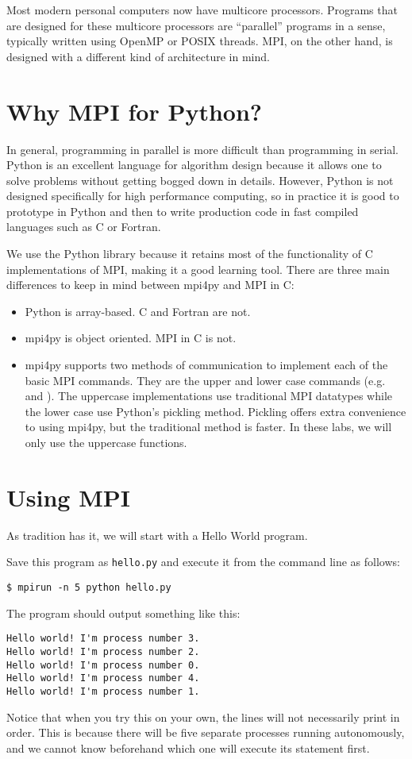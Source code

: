 \begin{info}
Most modern personal computers now have multicore processors. 
Programs that are designed for these multicore processors are ``parallel'' programs in a sense, typically written using OpenMP or POSIX threads.
MPI, on the other hand, is designed with a different kind of architecture in mind. 
\end{info}

\section*{Why MPI for Python?}
In general, programming in parallel is more difficult than programming in serial. 
Python is an excellent language for algorithm design because it allows one to solve problems without getting bogged down in details. 
However, Python is not designed specifically for high performance computing, so in practice it is good to prototype in Python and then to write production code in fast compiled languages such as C or Fortran.

We use the Python library  because it retains most of the functionality of 
C implementations of MPI, making it a good learning tool. 
There are three main differences to keep in mind between mpi4py and MPI in C:
\begin{itemize}
    \item Python is array-based. C and Fortran are not.
    \item mpi4py is object oriented. MPI in C is not.
    \item mpi4py supports two methods of communication to implement each of the basic MPI commands. 
    They are the upper and lower case commands (e.g.  and ). 
    The uppercase implementations use traditional MPI datatypes while the lower case use 
    Python's pickling method. Pickling offers extra convenience to using mpi4py, 
    but the traditional method is faster. In these labs, we will only use the uppercase functions.
\end{itemize}


\section*{Using MPI}
As tradition has it, we will start with a Hello World program.

Save this program as \texttt{hello.py} and execute it from the command line as follows:
\begin{lstlisting}[style=ShellInput]
$ mpirun -n 5 python hello.py
\end{lstlisting}
The program should output something like this:
\begin{lstlisting}[style=ShellOutput]
Hello world! I'm process number 3.
Hello world! I'm process number 2.
Hello world! I'm process number 0.
Hello world! I'm process number 4.
Hello world! I'm process number 1.
\end{lstlisting}
Notice that when you try this on your own, the lines will not necessarily print in order. 
This is because there will be five separate processes running autonomously, and we cannot 
know beforehand which one will execute its  statement first.

